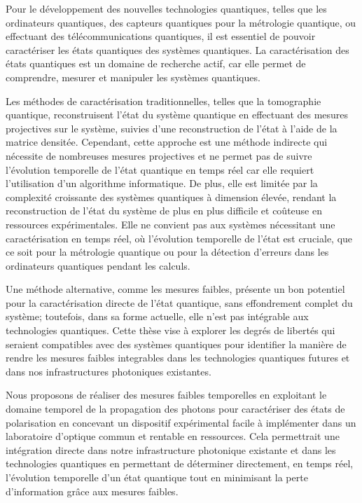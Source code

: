 \begin{onehalfspace}
    Pour le développement des nouvelles technologies quantiques, telles que les
    ordinateurs quantiques, des capteurs quantiques pour la métrologie
    quantique, ou effectuant des télécommunications quantiques, 
    il est essentiel de pouvoir
    caractériser les états quantiques des systèmes quantiques.
    La caractérisation des états
    quantiques est un domaine de recherche actif, car elle permet de
    comprendre, mesurer et manipuler les systèmes quantiques.

    \noindent Les méthodes de caractérisation traditionnelles, telles 
    que la tomographie quantique, reconstruisent l’état du système 
    quantique en effectuant des mesures projectives
    sur le système, suivies d’une reconstruction de l’état à l’aide
    de la matrice densitée.  Cependant, cette approche est une méthode indirecte qui nécessite
    de nombreuses mesures projectives et ne permet pas de suivre
    l’évolution temporelle de l’état quantique en temps réel car 
    elle requiert l'utilisation d'un algorithme informatique. 
    De plus, elle est limitée par la
    complexité croissante des systèmes quantiques à dimension élevée,
    rendant la reconstruction de l’état du système de plus en plus
    difficile et coûteuse en ressources expérimentales. Elle ne 
    convient pas aux systèmes nécessitant une caractérisation en temps 
    réel, où l’évolution temporelle de l’état est cruciale, que ce soit 
    pour la métrologie quantique ou pour la détection d’erreurs dans les 
    ordinateurs quantiques pendant les calculs. 

    \noindent Une méthode alternative, comme les mesures faibles, 
    présente un bon potentiel pour la caractérisation directe de l’état 
    quantique, sans effondrement complet du système; toutefois, dans sa forme 
    actuelle, elle n’est pas intégrable aux technologies quantiques. 
    Cette thèse vise à explorer les degrés de libertés 
    qui seraient compatibles avec 
    des systèmes quantiques pour identifier la manière de rendre 
    les mesures faibles integrables dans les technologies quantiques futures et
    dans nos infrastructures photoniques existantes.

    \noindent Nous proposons de réaliser des mesures faibles temporelles en exploitant
    le domaine temporel de la propagation des photons pour 
    caractériser des états de polarisation en concevant un dispositif
    expérimental facile à implémenter dans un laboratoire d'optique commun 
    et rentable en ressources. Cela permettrait une intégration
    directe dans notre infrastructure photonique existante et dans les technologies quantiques en permettant
    de déterminer directement, en temps réel, l’évolution temporelle d’un état
    quantique tout en minimisant la perte d’information grâce aux mesures faibles.

\end{onehalfspace}